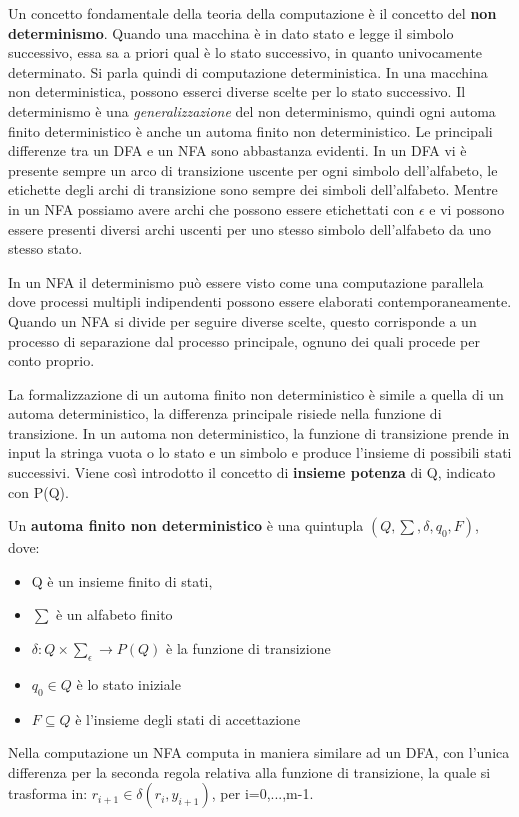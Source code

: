 \documentclass[a4paper]{extarticle}
\begin{document}
Un concetto fondamentale della teoria della computazione è il concetto del \textbf{non determinismo}. Quando una macchina è in dato stato e legge il simbolo successivo, essa sa a priori qual è lo stato successivo, in quanto univocamente determinato. Si parla quindi di computazione deterministica. In una macchina non deterministica, possono esserci diverse scelte per lo stato successivo. Il determinismo è una \textit{generalizzazione} del non determinismo, quindi ogni automa finito deterministico è anche un automa finito non deterministico. Le principali differenze tra un DFA e un NFA sono abbastanza evidenti. In un DFA vi è presente sempre un arco di transizione uscente per ogni simbolo dell'alfabeto, le etichette degli archi di transizione sono sempre dei simboli dell'alfabeto. Mentre in un NFA possiamo avere archi che possono essere etichettati con $\epsilon$ e vi possono essere presenti diversi archi uscenti per uno stesso simbolo dell'alfabeto da uno stesso stato.

In un NFA il determinismo può essere visto come una computazione parallela dove processi multipli indipendenti possono essere elaborati contemporaneamente. Quando un NFA si divide per seguire diverse scelte, questo corrisponde a un processo di separazione dal processo principale, ognuno dei quali procede per conto proprio.

La formalizzazione di un automa finito non deterministico è simile a quella di un automa deterministico, la differenza principale risiede nella funzione di transizione. In un automa non deterministico, la funzione di transizione prende in input la stringa vuota o lo stato e un simbolo e produce l'insieme di possibili stati successivi. Viene così introdotto il concetto di \textbf{insieme potenza} di Q, indicato con P(Q).

Un \textbf{automa finito non deterministico} è una quintupla $(Q,\sum,\delta,q_0,F)$, dove:
\begin{itemize}
\item Q è un insieme finito di stati,
\item $\sum$ è un alfabeto finito
\item $\delta: Q\times \sum_\epsilon \longrightarrow P(Q)$ è la funzione di transizione
\item $q_0 \in Q$ è lo stato iniziale
\item $F\subseteq Q$ è l'insieme degli stati di accettazione
\end{itemize}

Nella computazione un NFA computa in maniera similare ad un DFA, con l'unica differenza per la seconda regola relativa alla funzione di transizione, la quale si trasforma in: $r_{i+1} \in \delta(r_i,y_{i+1})$, per i=0,...,m-1.
\end{document}
